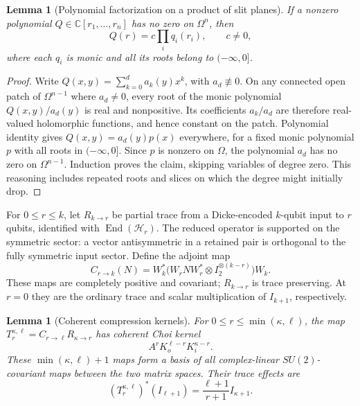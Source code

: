 \documentclass[reqno]{amsart}
\newtheorem{lemma}[theorem]{Lemma}
\theoremstyle{definition}
\theoremstyle{remark}
\newcommand{\C}{\mathbb C}
\begin{document}
\begin{lemma}[Polynomial factorization on a product of slit planes]
\label{spin:slit-product}
If a nonzero polynomial $Q\in\C[r_1,\ldots,r_n]$ has no zero on
$\Omega^n$, then
\begin{equation}\label{spin:slit-factor}
 Q(r)=c\prod_iq_i(r_i),\qquad c\ne0,
\end{equation}
where each $q_i$ is monic and all its roots belong to $(-\infty,0]$.
\end{lemma}

\begin{proof}
Write $Q(x,y)=\sum_{k=0}^da_k(y)x^k$, with $a_d\not\equiv0$.
On any connected open patch of $\Omega^{n-1}$ where $a_d\ne0$, every
root of the monic polynomial $Q(x,y)/a_d(y)$ is real and nonpositive.
Its coefficients $a_k/a_d$ are therefore real-valued holomorphic
functions, and hence constant on the patch.  Polynomial identity gives
$Q(x,y)=a_d(y)p(x)$ everywhere, for a fixed monic polynomial $p$ with
all roots in $(-\infty,0]$.  Since $p$ is nonzero on $\Omega$, the
polynomial $a_d$ has no zero on $\Omega^{n-1}$.  Induction proves the
claim, skipping variables of degree zero.  This reasoning includes
repeated roots and slices on which the degree might initially drop.
\end{proof}

For $0\leq r\leq k$, let $R_{k\to r}$ be partial trace from a
Dicke-encoded $k$-qubit input to $r$ qubits, identified with
$\operatorname{End}(\mathcal H_r)$.  The reduced operator is supported
on the symmetric sector: a vector antisymmetric in a retained pair is
orthogonal to the fully symmetric input sector.  Define the adjoint map
\begin{equation}\label{spin:raw-cloner}
 C_{r\to k}(N)=
 W_k^*\bigl(W_rNW_r^*\otimes I_2^{\otimes(k-r)}\bigr)W_k.
\end{equation}
These maps are completely positive and covariant; $R_{k\to r}$ is
trace preserving.  At $r=0$ they are the ordinary trace and scalar
multiplication of $I_{k+1}$, respectively.

\begin{lemma}[Coherent compression kernels]\label{spin:compression}
For $0\leq r\leq\min(\kappa,\ell)$, the map
$T_r^{\kappa,\ell}=C_{r\to\ell}R_{\kappa\to r}$ has coherent Choi
kernel
\begin{equation}\label{spin:basis-kernel}
 A^rK_o^{\ell-r}K_i^{\kappa-r}.
\end{equation}
These $\min(\kappa,\ell)+1$ maps form a basis of all complex-linear
$SU(2)$-covariant maps between the two matrix spaces.  Their trace
effects are
\begin{equation}\label{spin:basis-effect}
 (T_r^{\kappa,\ell})^*(I_{\ell+1})
            =\frac{\ell+1}{r+1}I_{\kappa+1}.
\end{equation}
\end{lemma}
\end{document}
